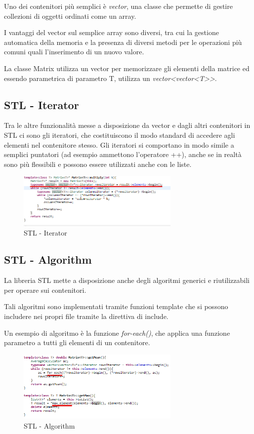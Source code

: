 Uno dei contenitori più semplici è \textit{vector}, una classe che permette di gestire collezioni di oggetti ordinati come un array.

I vantaggi del vector sul semplice array sono diversi, tra cui la gestione automatica della
memoria e la presenza di diversi metodi per le operazioni più comuni quali l'inserimento di un
nuovo valore.

La classe Matrix utilizza un vector per memorizzare gli elementi della matrice ed essendo
parametrica di parametro T, utilizza un \textit{vector<vector<T>>}.
\subsection{STL - Iterator}
Tra le altre funzionalità messe a disposizione da vector e dagli altri contenitori in STL ci sono gli
iteratori, che costituiscono il modo standard di accedere agli elementi nel contenitore stesso. Gli
iteratori si comportano in modo simile a semplici puntatori (ad esempio ammettono l'operatore ++),
anche se in realtà sono più flessibili e possono essere utilizzati anche con le liste.

\begin{figure}[h]
	\centering
	\includegraphics[width=0.7\textwidth]{Immagini/Stl_Iterator.png}
	\caption{STL - Iterator}
	\label{fig:Iterator}
\end{figure}

\subsection{STL - Algorithm}
La libreria STL mette a disposizione anche degli algoritmi generici e riutilizzabili per operare sui contenitori.

Tali algoritmi sono implementati tramite funzioni template che si possono includere nei propri file tramite la direttiva di include.

Un esempio di algoritmo è la funzione \textit{for-each()}, che applica una funzione parametro a tutti gli
elementi di un contenitore.

\begin{figure}[h]
	\centering
	\includegraphics[width=0.7\textwidth]{Immagini/Stl_Algorithm.png}
	\caption{STL - Algorithm}
	\label{fig:Algoritm}
\end{figure}